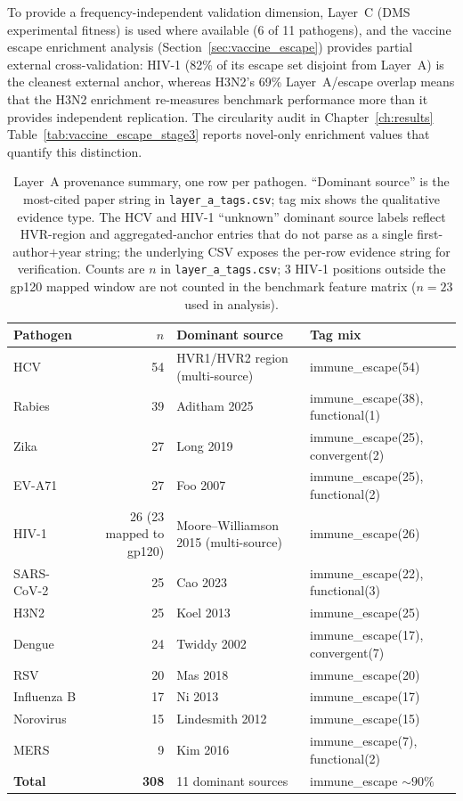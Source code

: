 To provide a frequency-independent validation dimension, Layer~C (DMS experimental fitness) is used where available (6 of 11 pathogens), and the vaccine escape enrichment analysis (Section~\ref{sec:vaccine_escape}) provides partial external cross-validation: HIV-1 (82\% of its escape set disjoint from Layer~A) is the cleanest external anchor, whereas H3N2's 69\% Layer~A/escape overlap means that the H3N2 enrichment re-measures benchmark performance more than it provides independent replication. The circularity audit in Chapter~\ref{ch:results} Table~\ref{tab:vaccine_escape_stage3} reports novel-only enrichment values that quantify this distinction.

\begin{table}[htbp]
\centering
\caption{Layer~A provenance summary, one row per pathogen. ``Dominant source'' is the most-cited paper string in \texttt{layer\_a\_tags.csv}; tag mix shows the qualitative evidence type. The HCV and HIV-1 ``unknown'' dominant source labels reflect HVR-region and aggregated-anchor entries that do not parse as a single first-author$+$year string; the underlying CSV exposes the per-row evidence string for verification. Counts are $n$ in \texttt{layer\_a\_tags.csv}; 3 HIV-1 positions outside the gp120 mapped window are not counted in the benchmark feature matrix ($n=23$ used in analysis).}
\label{tab:layer_a_provenance}
\small
\begin{tabular}{lrlp{}}
\toprule
\textbf{Pathogen} & \textbf{$n$} & \textbf{Dominant source} & \textbf{Tag mix} \\
\midrule
HCV & 54 & HVR1/HVR2 region (multi-source) & immune\_escape(54) \\
Rabies & 39 & Aditham 2025 & immune\_escape(38), functional(1) \\
Zika & 27 & Long 2019 & immune\_escape(25), convergent(2) \\
EV-A71 & 27 & Foo 2007 & immune\_escape(25), functional(2) \\
HIV-1 & 26 (23 mapped to gp120) & Moore--Williamson 2015 (multi-source) & immune\_escape(26) \\
SARS-CoV-2 & 25 & Cao 2023 & immune\_escape(22), functional(3) \\
H3N2 & 25 & Koel 2013 & immune\_escape(25) \\
Dengue & 24 & Twiddy 2002 & immune\_escape(17), convergent(7) \\
RSV & 20 & Mas 2018 & immune\_escape(20) \\
Influenza B & 17 & Ni 2013 & immune\_escape(17) \\
Norovirus & 15 & Lindesmith 2012 & immune\_escape(15) \\
MERS & 9 & Kim 2016 & immune\_escape(7), functional(2) \\
\midrule
\textbf{Total} & \textbf{308} & 11 dominant sources & immune\_escape ${\sim} 90\%$ \\
\bottomrule
\end{tabular}
\end{table}

